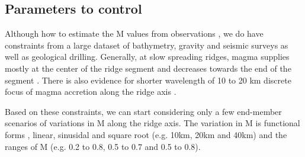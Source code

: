 \subsection{Parameters to control}
Although how to estimate the M values from observations , we do have constraints from a large dataset of bathymetry, gravity and seismic surveys as well as geological drilling. Generally, at slow spreading ridges, magma supplies mostly at the center of the ridge segment and decreases towards the end of the segment \citep{Tolstoy1993,Chen1999}. There is also evidence for shorter wavelength of 10 to 20 km discrete focus of magma accretion along the ridge axis \citep{Lin1990}. 

Based on these constraints, we can start considering only a few end-member scenarios of variations in M along the ridge axis. The variation in M is  functional forms  , linear, sinusidal and square root  (e.g. 10km, 20km and 40km) and the ranges of M (e.g. 0.2 to 0.8, 0.5 to 0.7 and 0.5 to 0.8). 

